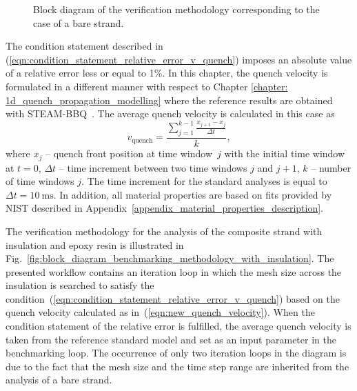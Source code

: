 \begin{figure}[H]
    \caption{Block diagram of the verification methodology corresponding to the case of a bare strand.}
    \label{fig:block_diagram_benchmarking_methodology_no_insulation}
\end{figure}

The condition statement described in (\ref{eqn:condition_statement_relative_error_v_quench}) imposes an absolute value of a relative error less or equal to 1\%. In this chapter, the quench velocity is formulated in a different manner with respect to Chapter \ref{chapter: 1d_quench_propagation_modelling} where the reference results are obtained with STEAM-BBQ~\cite{BBQ_manual}. The average quench velocity is calculated in this case as
\begin{equation}
    v_\text{quench} = \frac{ \sum_{j=1}^{k-1} \frac{x_{j+1}-x_j}{\Delta t} }{k},
    \label{eqn:new_quench_velocity}
\end{equation}
where $x_j$ -- quench front position at time window~$j$ with the initial time window at $t=0$, $\Delta t$ -- time increment between two time windows $j$ and $j+1$, $k$ -- number of time windows $j$. The time increment for the standard analyses is equal to $\Delta t=10~\text{ms}$. In addition, all material properties are based on fits provided by NIST described in Appendix~\ref{appendix_material_properties_description}.

The verification methodology for the analysis of the composite strand with insulation and epoxy resin is illustrated in Fig.~\ref{fig:block_diagram_benchmarking_methodology_with_insulation}. The presented workflow contains an iteration loop in which the mesh size across the insulation is searched to satisfy the condition~(\ref{eqn:condition_statement_relative_error_v_quench}) based on the quench velocity calculated as in~(\ref{eqn:new_quench_velocity}). When the condition statement of the relative error is fulfilled, the average quench velocity is taken from the reference standard model and set as an input parameter in the benchmarking loop. The occurrence of only two iteration loops in the diagram is due to the fact that the mesh size and the time step range are inherited from the analysis of a bare strand. 

